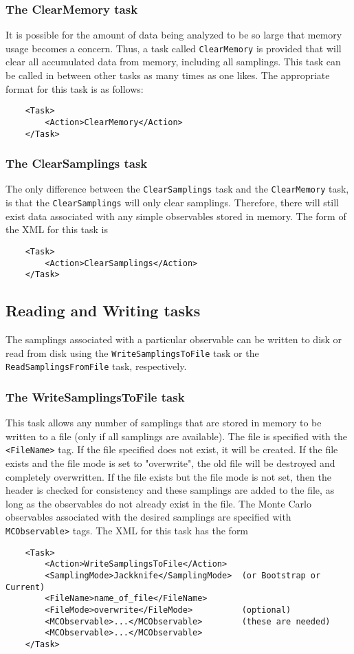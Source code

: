 \documentclass[12pt]{article}
\newcommand{\vb}{\texttt}
\begin{document}
\subsubsection{The ClearMemory task}

It is possible
for the amount of data being analyzed to be so large that memory usage
becomes a concern. Thus, a task called \vb{ClearMemory} is
provided that will clear all accumulated data from memory, including
all samplings. This task can be called
in between other tasks as many times as one likes.
The appropriate format for
this task is as follows:
\begin{verbatim}
    <Task>
        <Action>ClearMemory</Action>
    </Task>
\end{verbatim}

\subsubsection{The ClearSamplings task}
The only difference between the \vb{ClearSamplings} task and
the \vb{ClearMemory} task, is that the \vb{ClearSamplings} will
only clear samplings. Therefore, there will still exist data
associated with any simple observables stored in memory.
The form of the XML for this task is
\begin{verbatim}
    <Task>
        <Action>ClearSamplings</Action>
    </Task>
\end{verbatim}

\subsection{Reading and Writing tasks}

The samplings associated with a particular observable can be
written to disk or read from disk using the
\vb{WriteSamplingsToFile} task or the \vb{ReadSamplingsFromFile} task, respectively.

\subsubsection{The WriteSamplingsToFile task}
This task allows any number of samplings that are stored in memory to be written
to a file (only if all samplings are available).
The file is specified with the \vb{<FileName>} tag.
If the file specified does not exist, it will be created. If the file
exists and the file mode is set to "overwrite", the old file will be destroyed
and completely overwritten.  If the file exists but the file mode is not set,
then the header is checked for consistency and these
samplings are added to the file, as long as the observables do
not already exist in the file.
The Monte Carlo observables associated with the desired samplings are
specified with \vb{MCObservable>} tags.
The XML for this task has the form
\begin{verbatim}
    <Task> 
        <Action>WriteSamplingsToFile</Action> 
        <SamplingMode>Jackknife</SamplingMode>  (or Bootstrap or Current) 
        <FileName>name_of_file</FileName> 
        <FileMode>overwrite</FileMode>          (optional) 
        <MCObservable>...</MCObservable>        (these are needed) 
        <MCObservable>...</MCObservable> 
    </Task>
\end{verbatim}
\end{document}
